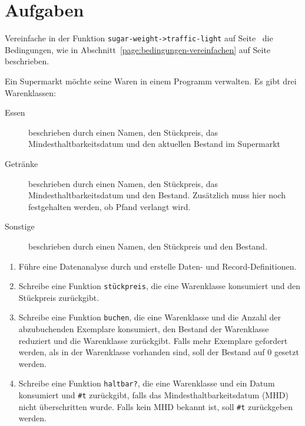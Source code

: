 \section*{Aufgaben}

\begin{aufgabe}
  Vereinfache in der Funktion \lstinline{sugar-weight->traffic-light} auf
  Seite~\pageref{def:sugar-weight-traffic-light} die Bedingungen, wie
  in Abschnitt~\ref{page:bedingungen-vereinfachen} auf
  Seite~\pageref{page:bedingungen-vereinfachen} beschrieben.
\end{aufgabe}

\begin{aufgabe}
  Ein Supermarkt möchte seine Waren in einem Programm verwalten. Es gibt
  drei Warenklassen:
  \begin{description}
  \item[Essen] beschrieben durch einen Namen, den Stückpreis, das Mindesthaltbarkeitsdatum
    und den aktuellen Bestand im Supermarkt
  \item[Getränke] beschrieben durch einen Namen, den Stückpreis, das Mindesthaltbarkeitsdatum
    und den Bestand. Zusätzlich muss hier noch festgehalten werden, ob Pfand verlangt wird.
  \item[Sonstige] beschrieben durch einen Namen, den Stückpreis und den Bestand.
  \end{description}

  
  \begin{enumerate}
  \item Führe eine Datenanalyse durch und erstelle Daten- und 
    Record-Definitionen.
  \item Schreibe eine Funktion \lstinline{stückpreis}, die eine Warenklasse
    konsumiert und den Stückpreis zurückgibt.
  \item Schreibe eine Funktion \lstinline{buchen}, die eine Warenklasse und die Anzahl der
    abzubuchenden Exemplare konsumiert, den Bestand der Warenklasse reduziert und die
    Warenklasse zurückgibt. Falls mehr Exemplare gefordert werden, als in der Warenklasse
    vorhanden sind, soll der Bestand auf 0 gesetzt werden.
  \item Schreibe eine Funktion \lstinline{haltbar?}, die eine
    Warenklasse und ein Datum konsumiert und \lstinline{#t} zurückgibt, falls das
    Mindesthaltbarkeitsdatum (MHD) nicht überschritten wurde. Falls kein MHD bekannt ist,
    soll \lstinline{#t} zurückgeben werden.
  \end{enumerate}
\end{aufgabe}

